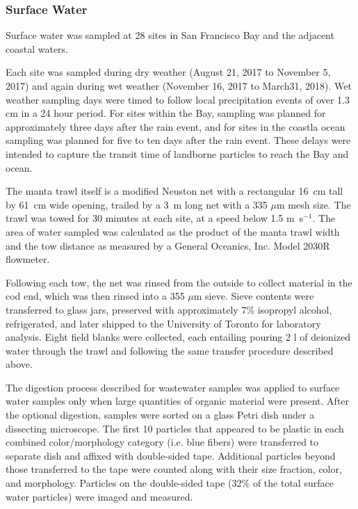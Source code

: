 \documentclass[draft]{jgr/agujournal2019}
\begin{document}
\subsubsection{Surface Water}

Surface water was sampled at 28 sites in San Francisco Bay and
the adjacent coastal waters. 

Each site was sampled during dry weather (August 21, 2017 to November
5, 2017) and again during wet weather (November 16, 2017 to March31,
2018). Wet weather sampling days were timed to follow local
precipitation events of over 1.3 cm in a 24 hour period. For sites
within the Bay, sampling was planned for approximately three days
after the rain event, and for sites in the coastla ocean sampling
was planned for five to ten days after the rain event. These delays
were intended to capture the transit time of landborne particles
to reach the Bay and ocean.

The manta trawl itself is a modified Neuston net with a rectangular
16~cm tall by 61~cm wide opening, trailed by a 3~m long net with a 335
$\mu\textrm{m}$ mesh size. The trawl was towed for 30 minutes at each
site, at a speed below 1.5 m~s$^{-1}$. The area of water sampled was
calculated as the product of the manta trawl width and the tow
distance as measured by a General Oceanics, Inc. Model 2030R
flowmeter.

Following each tow, the net was rinsed from the outside to collect
material in the cod end, which was then rinsed into a 355
$\mu\textrm{m}$ sieve. Sieve contents were transferred to glass jars,
preserved with approximately 7\% isopropyl alcohol, refrigerated, and
later shipped to the University of Toronto for laboratory analysis.
Eight field blanks were collected, each entailing pouring 2 l of
deionized water through the trawl and following the same transfer
procedure described above.


The digestion process described for wastewater samples was applied to
surface water samples only when large quantities of organic material
were present. After the optional digestion, samples were sorted on a
glass Petri dish under a dissecting microscope. The first 10 particles
that appeared to be plastic in each combined color/morphology category
(i.e.  blue fibers) were transferred to separate dish and affixed with
double-sided tape. Additional particles beyond those transferred to
the tape were counted along with their size fraction, color, and
morphology. Particles on the double-sided tape (32\% of the total
surface water particles) were imaged and measured.
\end{document}

